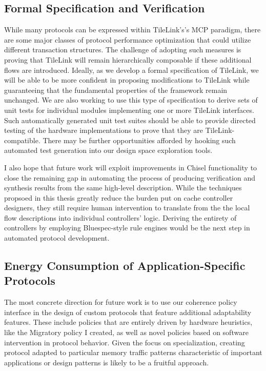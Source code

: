 \subsection{Formal Specification and Verification}

While many protocols can be expressed within TileLink's's MCP paradigm,
there are some major classes of protocol performance optimization that could
utilize different transaction structures.
The challenge of adopting such measures is proving that TileLink will remain hierarchically composable
if these additional flows are introduced.
Ideally, as we develop a formal specification of TileLink, we will be able to be more confident
in proposing modifications to TileLink while guaranteeing that the fundamental properties of the framework remain unchanged.
We are also working to use this type of specification to derive sets of unit tests for individual modules
implementing one or more TileLink interfaces.
Such automatically generated unit test suites should be able to provide directed
testing of the hardware implementations to prove that they are TileLink-compatible.
There may be further opportunities afforded by hooking such automated test generation into our design space exploration tools.

I also hope that future work will exploit improvements in Chisel functionality to close the remaining gap in
automating the process of producing verification and synthesis results from the same high-level description.
While the techniques propsoed in this thesis greatly reduce the burden put on cache controller designers,
they still require human intervention to translate from the the local flow descriptions into individual controllers' logic.
Deriving the entirety of controllers by employing Bluespec-style rule engines would be the next step in
automated protocol development.

\subsection{Energy Consumption of Application-Specific Protocols}

The most concrete direction for future work is to use our coherence policy interface
in the design of custom protocols that feature additional adaptability features.
These include policies that are entirely driven by hardware heuristics, like the Migratory policy
I created, as well as novel policies based on software intervention in protocol behavior.
Given the focus on specialization, creating protocol adapted to particular memory traffic patterns
characteristic of important applications or design patterns is likely to be a fruitful approach.

